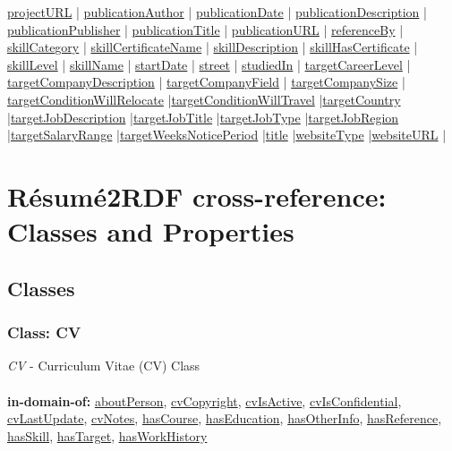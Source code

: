 \documentclass[a4paper,12pt]{article}
\numberwithin{equation}{section}
\begin{document}
\hyperlink{projectURL}{projectURL} |
\hyperlink{publicationAuthor}{publicationAuthor} |
\hyperlink{publicationDate}{publicationDate} |
\hyperlink{publicationDescription}{publicationDescription} |
\hyperlink{publicationPublisher}{publicationPublisher} |
\hyperlink{publicationTitle}{publicationTitle} |
\hyperlink{publicationURL}{publicationURL} |
\hyperlink{referenceBy}{referenceBy} |
\hyperlink{skillCategory}{skillCategory} |
\hyperlink{skillCertificateName}{skillCertificateName} |
\hyperlink{skillDescription}{skillDescription} | \hyperlink{skillHasCertificate}{skillHasCertificate} |  \hyperlink{skillLevel}{skillLevel} |
\hyperlink{skillName}{skillName} |  \hyperlink{startDate}{startDate} |
\hyperlink{street}{street} |
\hyperlink{studiedIn}{studiedIn} | \hyperlink{targetCareerLevel}{targetCareerLevel} | \hyperlink{targetCompanyDescription}{targetCompanyDescription} | \hyperlink{targetCompanyField}{targetCompanyField} | \hyperlink{targetCompanySize}{targetCompanySize} | \hyperlink{targetConditionWillRelocate}{targetConditionWillRelocate} |\hyperlink{targetConditionWillTravel}{targetConditionWillTravel} |\hyperlink{targetCountry}{targetCountry} |\hyperlink{targetJobDescription}{targetJobDescription}  |\hyperlink{targetJobTitle}{targetJobTitle}
|\hyperlink{targetJobType}{targetJobType}
|\hyperlink{targetJobRegion}{targetJobRegion} |\hyperlink{targetSalaryRange}{targetSalaryRange} |\hyperlink{targetWeeksNoticePeriod}{targetWeeksNoticePeriod} |\hyperlink{title}{title} 
|\hyperlink{websiteType}{websiteType} 
|\hyperlink{websiteURL}{websiteURL} |

\section{R{\'e}sum{\'e}2RDF cross-reference: Classes and Properties}

\subsection{Classes}
\subsubsection{Class: CV}\hypertarget{CV}{}
\textit{CV} - Curriculum Vitae (CV) Class
\\\\
\textbf{in-domain-of:} \hyperlink{aboutPerson}{aboutPerson}, \hyperlink{cvCopyright}{cvCopyright}, \hyperlink{cvIsActive}{cvIsActive}, \hyperlink{cvIsConfidential}{cvIsConfidential}, \hyperlink{cvLastUpdate}{cvLastUpdate},  \hyperlink{cvNotes}{cvNotes}, \hyperlink{hasCourse}{hasCourse}, \hyperlink{hasEducation}{hasEducation}, \hyperlink{hasOtherInfo}{hasOtherInfo},  \hyperlink{hasReference}{hasReference}, \hyperlink{hasSkill}{hasSkill}, \hyperlink{hasTarget}{hasTarget}, \hyperlink{hasWorkHistory}{hasWorkHistory}
\end{document}
